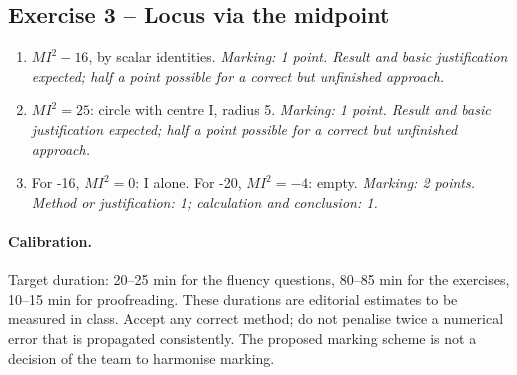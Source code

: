 \subsection*{Exercise 3 -- Locus via the midpoint}
\begin{enumerate}
\item $MI^2-16$, by scalar identities. \textit{Marking: 1 point. Result and basic justification expected; half a point possible for a correct but unfinished approach.}
\item $MI^2=25$: circle with centre I, radius 5. \textit{Marking: 1 point. Result and basic justification expected; half a point possible for a correct but unfinished approach.}
\item For -16, $MI^2=0$: I alone. For -20, $MI^2=-4$: empty. \textit{Marking: 2 points. Method or justification: 1; calculation and conclusion: 1.}
\end{enumerate}
\paragraph{Calibration.} Target duration: 20--25 min for the fluency questions, 80--85 min for the exercises, 10--15 min for proofreading. These durations are editorial estimates to be measured in class. Accept any correct method; do not penalise twice a numerical error that is propagated consistently. The proposed marking scheme is not a decision of the team to harmonise marking.
